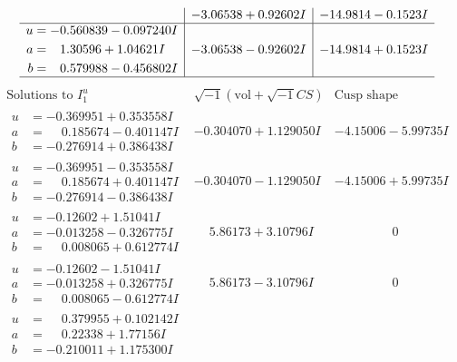 \documentclass[1p]{elsarticle_modified}
\theoremstyle{definition}
\newcommand{\I}{\sqrt{-1}}
\begin{document}
$$\begin{array}{c|c|c}
 & -3.06538 + 0.92602 I & -14.9814 - 0.1523 I \\ \hline\begin{aligned}
u &= -0.560839 - 0.097240 I \\
a &= \phantom{-}1.30596 + 1.04621 I \\
b &= \phantom{-}0.579988 - 0.456802 I\end{aligned}
 & -3.06538 - 0.92602 I & -14.9814 + 0.1523 I\\
 \hline 
 \end{array}$$\newpage$$\begin{array}{c|c|c}  
\text{Solutions to }I^u_{1}& \I (\text{vol} + \sqrt{-1}CS) & \text{Cusp shape}\\
 \hline 
\begin{aligned}
u &= -0.369951 + 0.353558 I \\
a &= \phantom{-}0.185674 - 0.401147 I \\
b &= -0.276914 + 0.386438 I\end{aligned}
 & -0.304070 + 1.129050 I & -4.15006 - 5.99735 I \\ \hline\begin{aligned}
u &= -0.369951 - 0.353558 I \\
a &= \phantom{-}0.185674 + 0.401147 I \\
b &= -0.276914 - 0.386438 I\end{aligned}
 & -0.304070 - 1.129050 I & -4.15006 + 5.99735 I \\ \hline\begin{aligned}
u &= -0.12602 + 1.51041 I \\
a &= -0.013258 - 0.326775 I \\
b &= \phantom{-}0.008065 + 0.612774 I\end{aligned}
 & \phantom{-}5.86173 + 3.10796 I & \phantom{-0.000000 } 0 \\ \hline\begin{aligned}
u &= -0.12602 - 1.51041 I \\
a &= -0.013258 + 0.326775 I \\
b &= \phantom{-}0.008065 - 0.612774 I\end{aligned}
 & \phantom{-}5.86173 - 3.10796 I & \phantom{-0.000000 } 0 \\ \hline\begin{aligned}
u &= \phantom{-}0.379955 + 0.102142 I \\
a &= \phantom{-}0.22338 + 1.77156 I \\
b &= -0.210011 + 1.175300 I\end{aligned}

\end{array}$$
\end{document}
